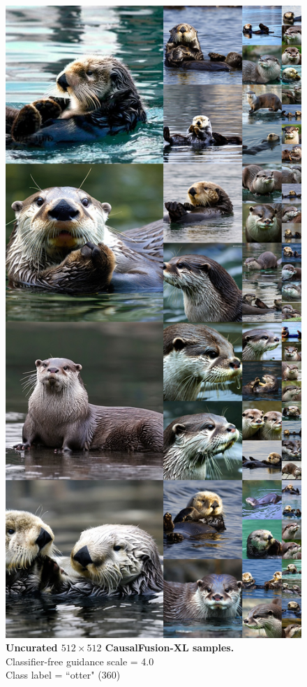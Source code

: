 \clearpage
\begin{figure}\centering
\includegraphics[width=\linewidth]{figs/xl512_360_cfg4.0.jpg}
\caption{\textbf{Uncurated $512\times512$ CausalFusion-XL samples.} \\Classifier-free guidance scale = 4.0\\Class label = ``otter" (360)}\vspace{-2mm}
\label{fig:samples512_1}
\end{figure}


